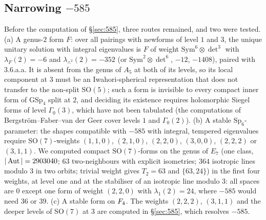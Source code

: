 \documentclass[11pt]{amsart}
\theoremstyle{definition}
\begin{document}
\subsection{Narrowing $-585$} Before the computation of \S\ref{sec:585}, three routes remained, and two were tested. (a) A genus-$2$ form $F$: over all pairings with newforms of level $1$ and $3$, the unique unitary solution with integral eigenvalues is $F$ of weight $\mathrm{Sym}^6\otimes\det^3$ with $\lambda_F(2)=-6$ and $\lambda_{\wedge^2}(2)=-352$ (or $\mathrm{Sym}^2\otimes\det^6$, $-12$, $-1408$), paired with \textsf{3.6.a.a}. It is absent from the genus of $A_5$ at both of its levels, so its local component at $3$ must be an Iwahori-spherical representation that does not transfer to the non-split $\mathrm{SO}(5)$; such a form is invisible to every compact inner form of $\mathrm{GSp}_4$ split at $2$, and deciding its existence requires holomorphic Siegel forms of level $\Gamma_0(3)$, which have not been tabulated (the computations of Bergstr\"om--Faber--van der Geer cover levels $1$ and $\Gamma_0(2)$). (b) A stable $\mathrm{Sp}_6$-parameter: the shapes compatible with $-585$ with integral, tempered eigenvalues require $\mathrm{SO}(7)$-weights $(1,1,0)$, $(2,1,0)$, $(2,2,0)$, $(3,0,0)$, $(2,2,2)$ or $(3,1,1)$. We computed compact $\mathrm{SO}(7)$-forms on the genus of $E_7$ (one class, $|\operatorname{Aut}|=2903040$; $63$ two-neighbours with explicit isometries; $364$ isotropic lines modulo $3$ in two orbits; trivial weight gives $T_2=63$ and $\{63,24\}$) in the first four weights, at level one and at the stabiliser of an isotropic line modulo $3$: all spaces are $0$ except one form of weight $(2,2,0)$ with $\lambda_1(2)=24$, where $-585$ would need $36$ or $39$. (c) A stable form on $F_4$. The weights $(2,2,2)$, $(3,1,1)$ and the deeper levels of $\mathrm{SO}(7)$ at $3$ are computed in \S\ref{sec:585}, which resolves $-585$.
\end{document}
